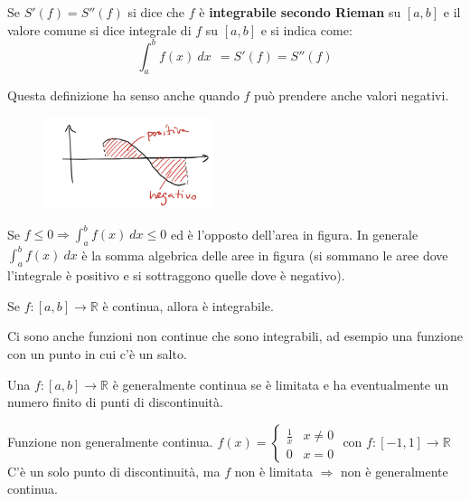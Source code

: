 \begin{definition}
Se $S'(f) = S''(f)$ si dice che $f$ è \textbf{integrabile secondo Rieman} su $[a,b]$ e il valore comune si dice integrale di $f$ su $[a,b]$ e si indica come:
\[\int_{a}^b f(x)\:dx \: \: = S'(f) = S''(f)\]
\end{definition}
\newpage
\begin{observation}
Questa definizione ha senso anche quando $f$ può prendere anche valori negativi.
\end{observation}
\begin{figure}
    \vspace{-15pt}
    \centering
    \includegraphics[width=5cm]{images/area-positiva-negativa.png}
\end{figure}
Se $f \leq 0 \Longrightarrow \int_a^b f(x)\:dx \leq 0$ ed è l'opposto dell'area in figura.
In generale $\int_a^b f(x)\:dx$ è la somma algebrica delle aree in figura (si sommano le aree dove l'integrale è positivo e si sottraggono quelle dove è negativo). \\

\begin{theorem}
Se $f: [a,b] \to \mathbb{R}$ è continua, allora è integrabile.
\end{theorem}

\begin{observation}
Ci sono anche funzioni non continue che sono integrabili, ad esempio una funzione con un punto in cui c'è un salto.
\end{observation}

\begin{definition}
Una $f: [a,b] \to \mathbb{R}$ è generalmente continua se è limitata e ha eventualmente un numero finito di punti di discontinuità.
\end{definition}

\begin{example}
Funzione non generalmente continua. $f(x) = \begin{cases}\frac{1}{x} & x\neq 0 \\ 0 & x=0\end{cases}$ con $f: [-1,1] \to \mathbb{R}$
\\C'è un solo punto di discontinuità, ma $f$ non è limitata $\Longrightarrow$ non è generalmente continua.
\end{example}

